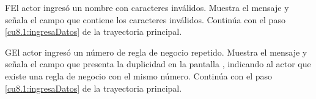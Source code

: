  \begin{UCtrayectoriaA}{F}{El actor ingresó un nombre con caracteres inválidos.}
    \UCpaso[\UCsist] Muestra el mensaje  y señala el campo que contiene los caracteres inválidos.
    \UCpaso[] Continúa con el paso \ref{cu8.1:ingresaDatos} de la trayectoria principal.
 \end{UCtrayectoriaA}
 \begin{UCtrayectoriaA}{G}{El actor ingresó un número de regla de negocio repetido.}
    \UCpaso[\UCsist] Muestra el mensaje  y señala el campo que presenta la duplicidad en la pantalla 
	    , indicando al actor que existe una regla de negocio con el mismo número.
    \UCpaso[] Continúa con el paso \ref{cu8.1:ingresaDatos} de la trayectoria principal.
 \end{UCtrayectoriaA}
 
